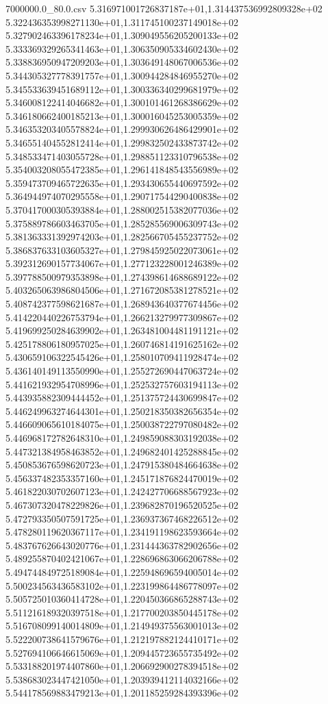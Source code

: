 \begin{filecontents*}{7000000.0_80.0.csv}
5.316971001726837187e+01,1.314437536992809328e+02
5.322436353998271130e+01,1.311745100237149018e+02
5.327902463396178234e+01,1.309049556205200133e+02
5.333369329265341463e+01,1.306350905334602430e+02
5.338836950947209203e+01,1.303649148067006536e+02
5.344305327778391757e+01,1.300944284846955270e+02
5.345533639451689112e+01,1.300336340299681979e+02
5.346008122414046682e+01,1.300101461268386629e+02
5.346180662400185213e+01,1.300016045253005359e+02
5.346353203405578824e+01,1.299930626486429901e+02
5.346551404552812414e+01,1.299832502433873742e+02
5.348533471403055728e+01,1.298851123310796538e+02
5.354003208055472385e+01,1.296141848543556989e+02
5.359473709465722635e+01,1.293430655440697592e+02
5.364944974070295558e+01,1.290717544290400838e+02
5.370417000305393884e+01,1.288002515382077036e+02
5.375889786603463705e+01,1.285285569006309743e+02
5.381363331392974203e+01,1.282566705455237752e+02
5.386837633103605327e+01,1.279845925022073061e+02
5.392312690157734067e+01,1.277123228001246389e+02
5.397788500979353898e+01,1.274398614688689122e+02
5.403265063986804506e+01,1.271672085381278521e+02
5.408742377598621687e+01,1.268943640377674456e+02
5.414220440226753794e+01,1.266213279977309867e+02
5.419699250284639902e+01,1.263481004481191121e+02
5.425178806180957025e+01,1.260746814191625162e+02
5.430659106322545426e+01,1.258010709411928474e+02
5.436140149113550990e+01,1.255272690447063724e+02
5.441621932954708996e+01,1.252532757603194113e+02
5.443935882309444452e+01,1.251375724430699847e+02
5.446249963274644301e+01,1.250218350382656354e+02
5.446609065610184075e+01,1.250038722797080482e+02
5.446968172782648310e+01,1.249859088303192038e+02
5.447321384958463852e+01,1.249682401425288845e+02
5.450853676598620723e+01,1.247915380484664638e+02
5.456337482353357160e+01,1.245171876824470019e+02
5.461822030702607123e+01,1.242427706688567923e+02
5.467307320478229826e+01,1.239682870196520525e+02
5.472793350507591725e+01,1.236937367468226512e+02
5.478280119620367117e+01,1.234191198623593664e+02
5.483767626643020776e+01,1.231444363782902656e+02
5.489255870402421067e+01,1.228696863066206788e+02
5.494744849725189084e+01,1.225948696594005014e+02
5.500234563436583102e+01,1.223199864486778097e+02
5.505725010360414728e+01,1.220450366865288743e+02
5.511216189320397518e+01,1.217700203850445178e+02
5.516708099140014809e+01,1.214949375563001013e+02
5.522200738641579676e+01,1.212197882124410171e+02
5.527694106646615069e+01,1.209445723655735492e+02
5.533188201974407860e+01,1.206692900278394518e+02
5.538683023447421050e+01,1.203939412114032166e+02
5.544178569883479213e+01,1.201185259284393396e+02

\end{filecontents*}
